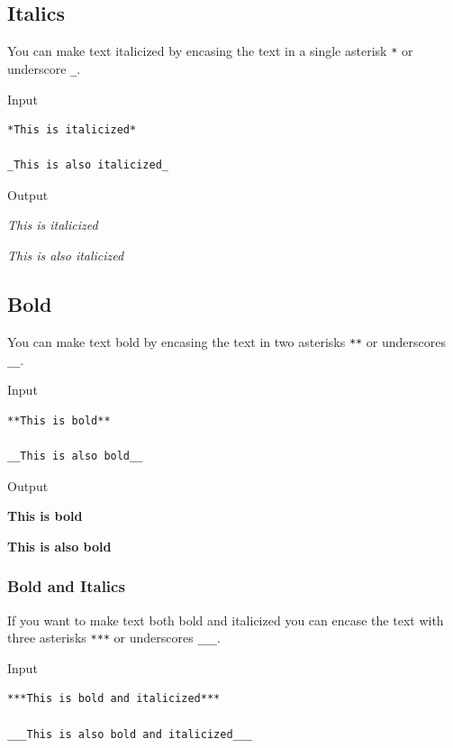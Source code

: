 \documentclass[
]{book}
\begin{document}
\hypertarget{italics}{%
\subsection*{Italics}\label{italics}}

You can make text italicized by encasing the text in a single asterisk \texttt{*} or underscore \texttt{\_}.

Input

\begin{verbatim}
*This is italicized*

_This is also italicized_
\end{verbatim}

Output

\emph{This is italicized}

\emph{This is also italicized}

\hypertarget{bold}{%
\subsection*{Bold}\label{bold}}

You can make text bold by encasing the text in two asterisks \texttt{**} or underscores
\texttt{\_\_}.

Input

\begin{verbatim}
**This is bold**

__This is also bold__
\end{verbatim}

Output

\textbf{This is bold}

\textbf{This is also bold}

\hypertarget{bold-and-italics}{%
\subsubsection*{Bold and Italics}\label{bold-and-italics}}

If you want to make text both bold and italicized you can encase the text with three asterisks \texttt{***} or underscores \texttt{\_\_\_}.

Input

\begin{verbatim}
***This is bold and italicized***

___This is also bold and italicized___
\end{verbatim}
\end{document}
